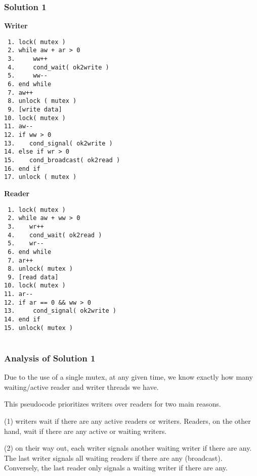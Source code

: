 \begin{frame}[fragile]
	\frametitle{Solution 1}

	\begin{multicols}{2}
		\small
		\textbf{Writer}
		\begin{verbatim}
 1. lock( mutex )
 2. while aw + ar > 0
 3.     ww++
 4.     cond_wait( ok2write )
 5.     ww--
 6. end while
 7. aw++
 8. unlock ( mutex )
 9. [write data]
10. lock( mutex )
11. aw--
12. if ww > 0
13.    cond_signal( ok2write )
14. else if wr > 0
15.    cond_broadcast( ok2read )
16. end if
17. unlock ( mutex )
		\end{verbatim}
		\columnbreak
		\textbf{Reader}
		\begin{verbatim}
 1. lock( mutex )
 2. while aw + ww > 0
 3.    wr++
 4.    cond_wait( ok2read )
 5.    wr--
 6. end while
 7. ar++
 8. unlock( mutex )
 9. [read data]
10. lock( mutex )
11. ar--
12. if ar == 0 && ww > 0
13.     cond_signal( ok2write )
14. end if
15. unlock( mutex )


		\end{verbatim}
	\end{multicols}
	\vspace{-2em}

\end{frame}


\begin{frame}[fragile]
	\frametitle{Analysis of Solution 1}
	Due to the use of a single mutex, at any given time, we know exactly how many waiting/active reader and writer threads we have.

	This pseudocode prioritizes writers over readers for two main reasons.

	(1) writers wait if there are any active readers or writers.
	Readers, on the other hand, wait if there are any active or waiting writers.


	(2) on their way out, each writer signals another waiting writer if there are any.
	The last writer signals all waiting readers if there are any (broadcast).
	Conversely, the last reader only signals a waiting writer if there are any.
\end{frame}


